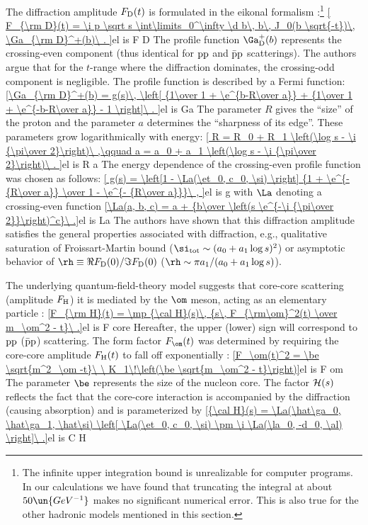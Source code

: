 The diffraction amplitude $F_{\rm D}(t)$ is formulated in the eikonal formalism :\footnote{%
The infinite upper integration bound is unrealizable for computer programs. In our calculations we have found that truncating the integral at about $50\un{GeV^{-1}}$ makes no significant numerical error. This is also true for the other hadronic models mentioned in this section.
}
\eqref{
	F_{\rm D}(t) = \i p \sqrt s \int\limits_0^\infty \d b\, b\, J_0(b \sqrt{-t})\, \Ga_{\rm D}^+(b)\ .
}{el is F D}
The profile function $\Ga_{\rm D}^+(b)$ represents the crossing-even component (thus identical for $\rm pp$ and $\rm\bar pp$ scatterings). The authors argue that for the $t$-range where the diffraction dominates, the crossing-odd component is negligible. The profile function is described by a Fermi function:
\eqref{\Ga_{\rm D}^+(b) =
	g(s)\, \left[
		{1\over 1 + \e^{b-R\over a}}
		+ {1\over 1 + \e^{-b-R\over a}}
		- 1
	\right]\ .
}{el is Ga}
The parameter $R$ gives the ``size'' of the proton and the parameter $a$ determines the ``sharpness of its edge''. These parameters grow logarithmically with energy:
\eqref{
	R = R_0 + R_1 \left(\log s - \i {\pi\over 2}\right)\ ,\qquad
	a = a_0 + a_1 \left(\log s - \i {\pi\over 2}\right)\ .
}{el is R a}
The energy dependence of the crossing-even profile function was chosen as follows:
\eqref{
	g(s) =  \left[1 - \La(\et_0, c_0, \si) \right] {1 + \e^{-{R\over a}} \over 1 - \e^{- {R\over a}}}\ ,
}{el is g}
with $\La$ denoting a crossing-even function
\eqref{\La(a, b, c) = a + {b\over \left(s \e^{-\i {\pi\over 2}}\right)^c}\ .}{el is La}
The authors have shown  that this diffraction amplitude satisfies the general properties associated with diffraction, e.g., qualitative saturation of Froissart-Martin bound ($\si_{\rm tot} \sim (a_0 + a_1\log s)^2$) or asymptotic behavior of $\rh \equiv \Re F_{\rm D}(0) / \Im F_{\rm D}(0)$ ($\rh \sim \pi a_1 / (a_0 + a_1 \log s)$).

The underlying quantum-field-theory model suggests that core-core scattering (amplitude $F_{\rm H}$) it is mediated by the $\rm\om$ meson, acting as an elementary particle :
\eqref{F_{\rm H}(t) = \mp {\cal H}(s)\, {s\, F_{\rm\om}^2(t) \over m_\om^2 - t}\ .}{el is F core}
Hereafter, the upper (lower) sign will correspond to $\rm pp$ ($\rm\bar pp$) scattering. The form factor $F_\om(t)$ was determined by requiring the core-core amplitude $F_{\rm H}(t)$ to fall off exponentially :
\eqref{F_\om(t)^2 = \be \sqrt{m^2_\om -t}\ \ K_1\!\left(\be \sqrt{m_\om^2 - t}\right)}{el is F om}
The parameter $\be$ represents the size of the nucleon core. The factor ${\cal H}(s)$ reflects the fact that the core-core interaction is accompanied by the diffraction (causing absorption) and is parameterized by
\eqref{{\cal H}(s) = \La(\hat\ga_0, \hat\ga_1, \hat\si) \left[ \La(\et_0, c_0, \si) \pm \i \La(\la_0, -d_0, \al) \right]\ .}{el is C H}

